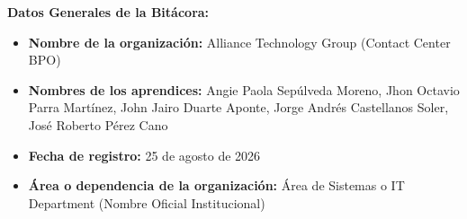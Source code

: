 	\vspace{0.3cm}
	\noindent\textbf{Datos Generales de la Bitácora:}
	\begin{itemize}
		\item \textbf{Nombre de la organización:} Alliance Technology Group (Contact Center BPO)
		\item \textbf{Nombres de los aprendices:} Angie Paola Sepúlveda Moreno, Jhon Octavio Parra Martínez, John Jairo Duarte Aponte, Jorge Andrés Castellanos Soler, José Roberto Pérez Cano
		\item \textbf{Fecha de registro:} 25 de agosto de 2026
		\item \textbf{Área o dependencia de la organización:} Área de Sistemas o IT Department (Nombre Oficial Institucional)
	\end{itemize}
	
